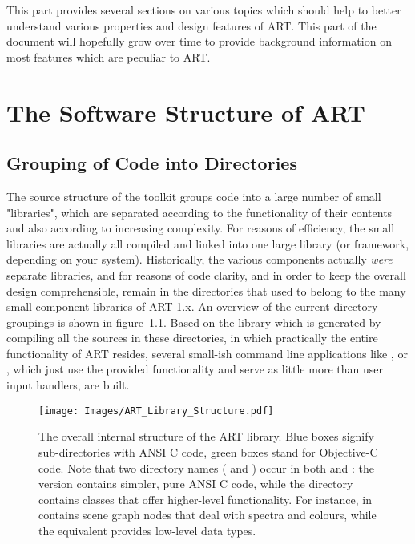 This part provides several sections on various topics which should help to
better understand various properties and design features of ART. This part of
the document will hopefully grow over time to provide background information on
most features which are peculiar to ART.

\chapter{The Software Structure of ART}

\section{Grouping of Code into Directories}

The source structure of the toolkit groups code into a large number of
small "libraries", which are separated according to the functionality of their
contents and also according to increasing complexity. For reasons of efficiency, the small libraries are actually all compiled and linked into one large library (or framework, depending on your system). Historically, the various components actually \textit{were} separate libraries, and for reasons of code clarity, and in order to keep the overall design comprehensible, remain in the directories that used to belong to the many small component libraries of ART 1.x. An overview of the current directory groupings is shown in figure~\ref{fig:librarystructure}. Based on the library which is generated by compiling all the sources in these directories, in which practically the entire functionality of ART resides, several small-ish command line
applications like ,  or , which just use the provided functionality and serve as little more than user input handlers, are built.

\begin{figure}[htbp]
\begin{center}
\texttt{[image: Images/ART\_Library\_Structure.pdf]} 
\end{center}
\caption{
\label{fig:librarystructure} 
The overall internal structure of the ART library. Blue boxes signify sub-directories with ANSI C code, green boxes stand for Objective-C code. Note that two directory names ( and ) occur in both  and : the  version contains simpler, pure ANSI C code, while the  directory contains classes that offer higher-level functionality. For instance,  in  contains scene graph nodes that deal with spectra and colours, while the 
 equivalent provides low-level data types.}
\end{figure}

